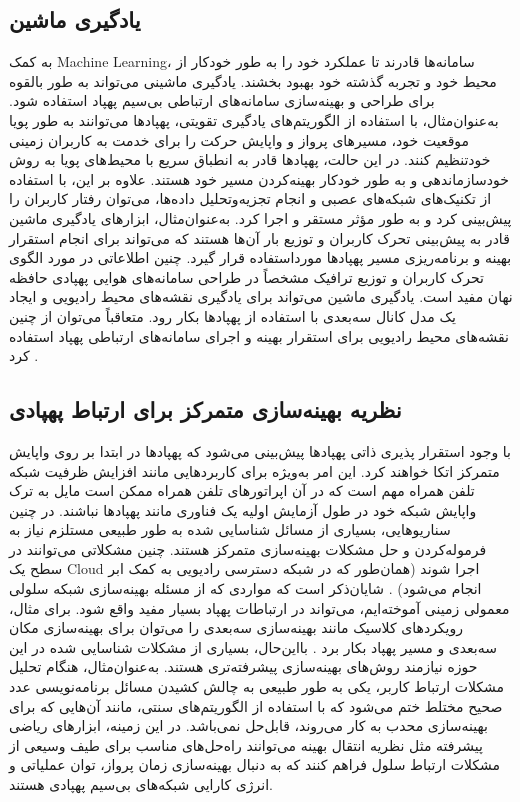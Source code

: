 \subsection{یادگیری ماشین}
به کمک \gls{Machine Learning}، سامانه‌ها قادرند تا عملکرد خود را به طور خودکار از محیط خود و تجربه گذشته خود بهبود بخشند. یادگیری ماشینی می‌تواند به طور بالقوه برای طراحی و بهینه‌سازی سامانه‌های ارتباطی بی‌سیم پهپاد استفاده شود. به‌عنوان‌مثال، با استفاده از الگوریتم‌های یادگیری تقویتی، پهپادها می‌توانند به طور پویا موقعیت خود، مسیرهای پرواز و واپایش حرکت را برای خدمت به کاربران زمینی خودتنظیم کنند. در این حالت، پهپادها قادر به انطباق سریع با محیط‌های پویا به روش خودسازماندهی و به طور خودکار بهینه‌کردن مسیر خود هستند. علاوه بر این، با استفاده از تکنیک‌های شبکه‌های عصبی و انجام تجزیه‌وتحلیل داده‌ها، می‌توان رفتار کاربران را پیش‌بینی کرد و به طور مؤثر مستقر و اجرا کرد. به‌عنوان‌مثال، ابزارهای یادگیری ماشین قادر به پیش‌بینی تحرک کاربران و توزیع بار آن‌ها هستند که می‌تواند برای انجام استقرار بهینه و برنامه‌ریزی مسیر پهپادها مورداستفاده قرار گیرد. چنین اطلاعاتی در مورد الگوی تحرک کاربران و توزیع ترافیک مشخصاً در طراحی سامانه‌های هوایی پهپادی حافظه نهان مفید است. یادگیری ماشین می‌تواند برای یادگیری نقشه‌های محیط رادیویی و ایجاد یک مدل کانال سه‌بعدی با استفاده از پهپادها بکار رود. متعاقباً می‌توان از چنین نقشه‌های محیط رادیویی برای استقرار بهینه و اجرای سامانه‌های ارتباطی پهپاد استفاده کرد \cite{chen2017machine,challita2019machine,s19235170,s19235170}.
\subsection{نظریه بهینه‌سازی متمرکز برای ارتباط پهپادی}
با وجود استقرار پذیری ذاتی پهپادها پیش‌بینی می‌شود که پهپادها در ابتدا بر روی واپایش متمرکز اتکا خواهند کرد. این امر به‌ویژه برای کاربردهایی مانند افزایش ظرفیت شبکه تلفن همراه مهم است که در آن اپراتورهای تلفن همراه ممکن است مایل به ترک واپایش شبکه خود در طول آزمایش اولیه یک فناوری مانند پهپادها نباشند. در چنین سناریوهایی، بسیاری از مسائل شناسایی شده به طور طبیعی مستلزم نیاز به فرموله‌کردن و حل مشکلات بهینه‌سازی متمرکز هستند. چنین مشکلاتی می‌توانند در سطح یک \gls{Cloud} اجرا شوند (همان‌طور که در شبکه دسترسی رادیویی به کمک ابر انجام می‌شود) \cite{peng2016recent}.
شایان‌ذکر است که مواردی که از مسئله بهینه‌سازی شبکه سلولی معمولی زمینی آموخته‌ایم، می‌تواند در ارتباطات پهپاد بسیار مفید واقع شود. برای مثال، رویکردهای کلاسیک مانند بهینه‌سازی سه‌بعدی را می‌توان برای بهینه‌سازی مکان سه‌بعدی و مسیر پهپاد بکار برد \cite{fiacco1990nonlinear}.
بااین‌حال، بسیاری از مشکلات شناسایی شده در این حوزه نیازمند روش‌های بهینه‌سازی پیشرفته‌تری هستند. به‌عنوان‌مثال، هنگام تحلیل مشکلات ارتباط کاربر، یکی به طور طبیعی به چالش کشیدن مسائل برنامه‌نویسی عدد صحیح مختلط ختم می‌شود که با استفاده از الگوریتم‌های سنتی، مانند آن‌هایی که برای بهینه‌سازی محدب به کار می‌روند، قابل‌حل نمی‌باشد. در این زمینه، ابزارهای ریاضی پیشرفته مثل نظریه انتقال بهینه می‌توانند راه‌حل‌های مناسب برای طیف وسیعی از مشکلات ارتباط سلول فراهم کنند که به دنبال بهینه‌سازی زمان پرواز، توان عملیاتی و انرژی کارایی شبکه‌های بی‌سیم پهپادی هستند.
